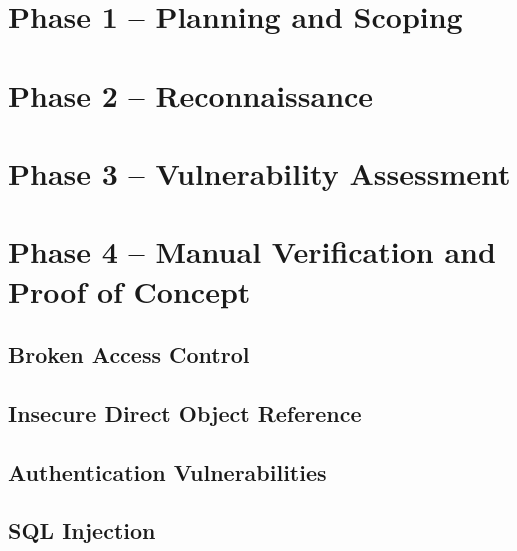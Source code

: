 \documentclass[11pt,a4paper]{report}
\begin{document}
\chapter{Phase 1 -- Planning and Scoping}
\label{chap:phase1}



\chapter{Phase 2 -- Reconnaissance}
\label{chap:phase2}



\chapter{Phase 3 -- Vulnerability Assessment}
\label{chap:phase3}



\chapter{Phase 4 -- Manual Verification and Proof of Concept}
\label{chap:phase4}

\section{Broken Access Control}


\section{Insecure Direct Object Reference}


\section{Authentication Vulnerabilities}


\section{SQL Injection}

\end{document}
